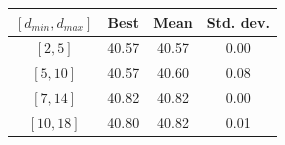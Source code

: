 \begin{tabular}{cccc}
\toprule
$[d_{min}, d_{max}]$ & Best & Mean & Std. dev. \\
\midrule
$[2, 5]$ & 40.57 & 40.57 & 0.00 \\
$[5, 10]$ & 40.57 & 40.60 & 0.08 \\
$[7, 14]$ & 40.82 & 40.82 & 0.00 \\
$[10, 18]$ & 40.80 & 40.82 & 0.01 \\
\bottomrule
\end{tabular}
